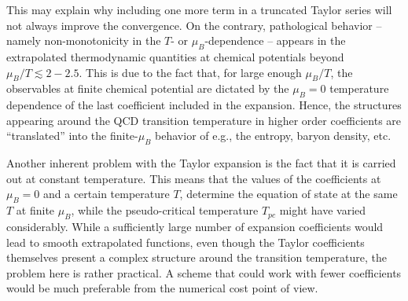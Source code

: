 \documentclass[aps,prd,twocolumn,superscriptaddress]{revtex4-2}
\begin{document}
 
This may explain why including one more term in a truncated Taylor series will
not always improve the convergence.  On the contrary, pathological behavior --
namely non-monotonicity in the $T$- or $\mu_B$-dependence -- appears in the
extrapolated thermodynamic quantities at chemical potentials beyond $\mu_B/T
\lesssim 2-2.5$. This is due to the fact that, for large enough $\mu_B/T$, the
observables at finite chemical potential are dictated by the $\mu_B=0$
temperature dependence of the last coefficient included in the expansion.
Hence, the structures appearing around the QCD transition temperature in higher
order coefficients are ``translated'' into the finite-$\mu_B$ behavior of e.g.,
the entropy, baryon density, etc.

Another inherent problem with the Taylor expansion is the fact that it is carried
out at constant temperature. This means that the values of the coefficients
at $\mu_B=0$ and a certain temperature $T$, %
determine the equation of state at the same $T$ at finite $\mu_B$, while the pseudo-critical
temperature $T_{pc}$ might have varied considerably. While a sufficiently
large number of expansion coefficients would lead to smooth extrapolated functions, even though the Taylor coefficients themselves present a complex structure around the transition temperature, the problem here is rather practical. A scheme that could work
with fewer coefficients would be much preferable from the numerical cost point of view.
\end{document}
